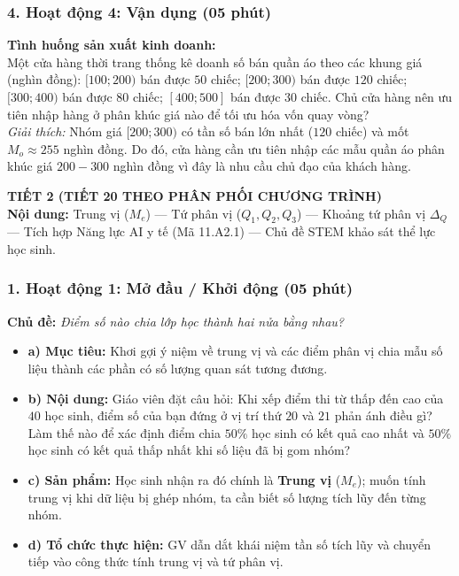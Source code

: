 \documentclass[12pt, a4paper]{article}
\begin{document}
\subsubsection*{4. Hoạt động 4: Vận dụng (05 phút)}
\textbf{Tình huống sản xuất kinh doanh:}\\
Một cửa hàng thời trang thống kê doanh số bán quần áo theo các khung giá (nghìn đồng): $[100; 200)$ bán được $50$ chiếc; $[200; 300)$ bán được $120$ chiếc; $[300; 400)$ bán được $80$ chiếc; $[400; 500]$ bán được $30$ chiếc. Chủ cửa hàng nên ưu tiên nhập hàng ở phân khúc giá nào để tối ưu hóa vốn quay vòng?\\
\textit{Giải thích:} Nhóm giá $[200; 300)$ có tần số bán lớn nhất ($120$ chiếc) và mốt $M_o \approx 255$ nghìn đồng. Do đó, cửa hàng cần ưu tiên nhập các mẫu quần áo phân khúc giá $200 - 300$ nghìn đồng vì đây là nhu cầu chủ đạo của khách hàng.

\newpage

{\large \textbf{TIẾT 2 (TIẾT 20 THEO PHÂN PHỐI CHƯƠNG TRÌNH)}}\\[0.3em]
\textbf{Nội dung:} Trung vị ($M_e$) --- Tứ phân vị ($Q_1, Q_2, Q_3$) --- Khoảng tứ phân vị $\Delta_Q$ --- Tích hợp Năng lực AI y tế (Mã 11.A2.1) --- Chủ đề STEM khảo sát thể lực học sinh.

\subsubsection*{1. Hoạt động 1: Mở đầu / Khởi động (05 phút)}
\textbf{Chủ đề:} \textit{Điểm số nào chia lớp học thành hai nửa bằng nhau?}
\begin{itemize}
    \item \textbf{a) Mục tiêu:} Khơi gợi ý niệm về trung vị và các điểm phân vị chia mẫu số liệu thành các phần có số lượng quan sát tương đương.
    \item \textbf{b) Nội dung:} Giáo viên đặt câu hỏi: Khi xếp điểm thi từ thấp đến cao của $40$ học sinh, điểm số của bạn đứng ở vị trí thứ $20$ và $21$ phản ánh điều gì? Làm thế nào để xác định điểm chia $50\%$ học sinh có kết quả cao nhất và $50\%$ học sinh có kết quả thấp nhất khi số liệu đã bị gom nhóm?
    \item \textbf{c) Sản phẩm:} Học sinh nhận ra đó chính là \textbf{Trung vị} ($M_e$); muốn tính trung vị khi dữ liệu bị ghép nhóm, ta cần biết số lượng tích lũy đến từng nhóm.
    \item \textbf{d) Tổ chức thực hiện:} GV dẫn dắt khái niệm tần số tích lũy và chuyển tiếp vào công thức tính trung vị và tứ phân vị.
\end{itemize}
\end{document}
